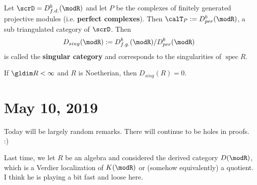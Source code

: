 \documentclass[12pt]{article}
\begin{document}
\begin{ex}
	Let $\scrD=D^b_{f.d.}(\modR)$ and let $P$ be the complexes of finitely generated projective modules (i.e. \textbf{perfect complexes}).
	Then $\calT_P:=D_{per}^b(\modR)$, a sub triangulated category of $\scrD$. Then 
	\[D_{sing}(\modR):=D^b_{f.g.}(\modR)/D_{per}^b(\modR)\]
	is called the \textbf{singular category} and corresponds to the singularities of $\operatorname{spec} R$.
\end{ex}
\begin{rmk}
	If $\gldim R <\infty$ and $R$ is Noetherian, then $D_{sing}(R)=0$.
\end{rmk}

\section{May 10, 2019}
Today will be largely random remarks. There will continue to be holes in proofs. :)

Last time, we let $R$ be an algebra and considered the derived category $D(\modR)$, which is a Verdier localization of $K(\modR)$
or (somehow equivalently) a quotient. I think he is playing a bit fast and loose here.
\end{document}
